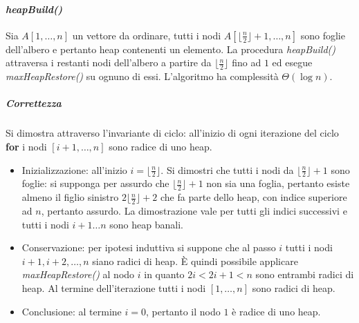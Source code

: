 \paragraph{\emph{heapBuild()}}
Sia $A[1,\dots, n]$ un vettore da ordinare, tutti i nodi $A[\lfloor \frac{n}{2}\rfloor+1,\dots, n]$ sono foglie dell'albero e pertanto heap contenenti un 
elemento. La procedura \emph{heapBuild()} attraversa i restanti nodi dell'albero a partire da $\lfloor \frac{n}{2}\rfloor$ fino ad $1$ ed esegue 
\emph{maxHeapRestore()} su ognuno di essi. L'algoritmo ha complessit\`a $\Theta(\log n)$. 

\subparagraph{Correttezza}
Si dimostra attraverso l'invariante di ciclo: all'inizio di ogni iterazione del ciclo \textbf{for} i nodi $[i+1,\dots, n]$ sono radice di uno heap.
\begin{itemize}
	\item Inizializzazione: all'inizio $i=\biggl\lfloor \frac{n}{2}\biggr\rfloor$. Si dimostri che tutti i nodi da $\biggl\lfloor\frac{n}{2}\biggr\rfloor + 1$ sono foglie: si 
		supponga per assurdo che $\biggl\lfloor \frac{n}{2}\biggr\rfloor+1$ non sia una foglia, pertanto esiste almeno il figlio sinistro 
		$2\biggl\lfloor \frac{n}{2}\biggr\rfloor+2$ che fa parte dello heap, con indice superiore ad $n$, pertanto assurdo. La dimostrazione vale per tutti gli indici successivi 
		e tutti i nodi $i+1\dots n$ sono heap banali.
	\item Conservazione: per ipotesi induttiva si suppone che al passo $i$ tutti i nodi $i+1, i+2, \dots, n$ siano radici di heap. \`E quindi possibile applicare 
		\emph{maxHeapRestore()} al nodo $i$ in quanto $2i< 2i+1< n$ sono entrambi radici di heap. Al termine dell'iterazione tutti i nodi $[1,\dots, n]$ sono radici di heap.
	\item Conclusione: al termine $i=0$, pertanto il nodo $1$ \`e radice di uno heap. 
\end{itemize}
